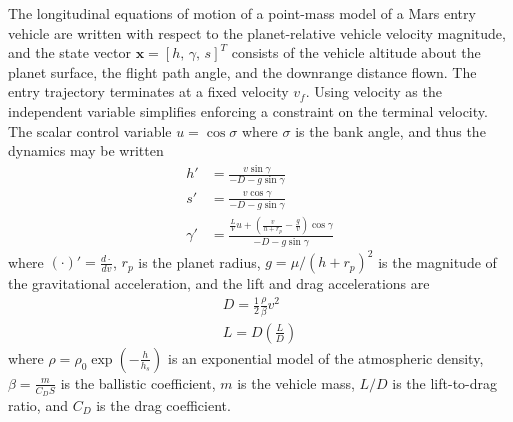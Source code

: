 \documentclass[journal ]{new-aiaa}
\newcommand{\state}{\ensuremath{\mathbf{x}}}
\begin{document}
The longitudinal equations of motion of a point-mass model of a Mars entry vehicle are written with respect to the planet-relative vehicle velocity magnitude, and the state vector $\state=[h,\,\gamma,\, s]^T$ consists of the vehicle altitude about the planet surface, the flight path angle, and the downrange distance flown. The entry trajectory terminates at a fixed velocity $v_f$. Using velocity as the independent variable simplifies enforcing a constraint on the terminal velocity. The scalar control variable $u=\cos\sigma$ where $\sigma$ is the bank angle, and thus the dynamics may be written
\begin{align}
h' &= \frac{v\sin\gamma}{-D - g\sin\gamma} \label{eq_dynamics_altitude}\\
s' &= \frac{v\cos\gamma}{-D - g\sin\gamma} \\
\gamma' &= \frac{\frac{L}{V}u + \left(\frac{v}{h+r_p}-\frac{g}{v}\right)\cos\gamma}{-D - g\sin\gamma} \label{eq_dynamics_fpa}
\end{align}
where $(\cdot)' = \frac{d\cdot}{dv}$, $r_p$ is the planet radius, $g=\mu/(h+r_p)^2$ is the magnitude of the gravitational acceleration, and the lift and drag accelerations are
\begin{align}
D = \frac{1}{2}\frac{\rho}{\beta} v^2 \\
L = D(\frac{L}{D})
\end{align}
where $\rho=\rho_0\exp\left(-\frac{h}{h_s}\right)$ is an exponential model of the atmospheric density, $\beta=\frac{m}{C_DS}$ is the ballistic coefficient, $m$ is the vehicle mass, $L/D$ is the lift-to-drag ratio, and $C_D$ is the drag coefficient.
\end{document}
